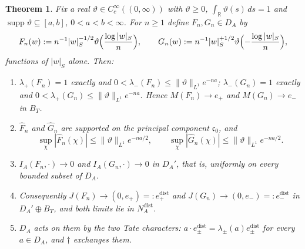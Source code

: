 \documentclass[11pt]{amsart}
\newtheorem{theorem}{Theorem}[section]
\theoremstyle{definition}
\theoremstyle{remark}
\newcommand{\R}{\mathbb R}
\newcommand{\supp}{\operatorname{supp}}
\newcommand{\DA}{D_A}
\newcommand{\BT}{B_T}
\newcommand{\NAd}{N_A^{\mathrm{dist}}}
\begin{document}
\begin{theorem}\label{thm:rulings}
Fix a real $\vartheta\in C_c^{\infty}((0,\infty))$ with $\vartheta\ge0$,
$\int_{\R}\vartheta(s)\,ds=1$ and $\supp\vartheta\subseteq[a,b]$, $0<a<b<\infty$.  For
$n\ge1$ define $F_n,G_n\in\DA$ by
\begin{equation}\label{eq:spread}
F_n(w):=n^{-1}|w|_S^{-1/2}\vartheta\Bigl(\frac{\log|w|_S}{n}\Bigr),\qquad
G_n(w):=n^{-1}|w|_S^{+1/2}\vartheta\Bigl(-\frac{\log|w|_S}{n}\Bigr),
\end{equation}
functions of $|w|_S$ alone.  Then:
\begin{enumerate}
\item[(a)] $\lambda_+(F_n)=1$ exactly and $0<\lambda_-(F_n)\le\lVert\vartheta
\rVert_{L^1}e^{-na}$; $\lambda_-(G_n)=1$ exactly and
$0<\lambda_+(G_n)\le\lVert\vartheta\rVert_{L^1}e^{-na}$.  Hence $M(F_n)\to e_+$ and
$M(G_n)\to e_-$ in $\BT$.
\item[(b)] $\widehat F_n$ and $\widehat G_n$ are supported on the principal
component $\mathfrak c_0$, and
\begin{equation}\label{eq:supFhat}
\sup_{\chi}|\widehat F_n(\chi)|\le\lVert\vartheta\rVert_{L^1}e^{-na/2},\qquad
\sup_{\chi}|\widehat G_n(\chi)|\le\lVert\vartheta\rVert_{L^1}e^{-na/2}.
\end{equation}
\item[(c)] $I_A(F_n,\cdot)\to0$ and $I_A(G_n,\cdot)\to0$ in $\DA'$, that is,
uniformly on every bounded subset of $\DA$.
\item[(d)] Consequently $J(F_n)\to(0,e_+)=:e_+^{\mathrm{dist}}$ and
$J(G_n)\to(0,e_-)=:e_-^{\mathrm{dist}}$ in $\DA'\oplus\BT$, and both limits
lie in $\NAd$.
\item[(e)] $\DA$ acts on them by the two Tate characters:
$a\cdot e_{\pm}^{\mathrm{dist}}=\lambda_{\pm}(a)e_{\pm}^{\mathrm{dist}}$ for
every $a\in\DA$, and $\dagger$ exchanges them.
\end{enumerate}
\end{theorem}
\end{document}
